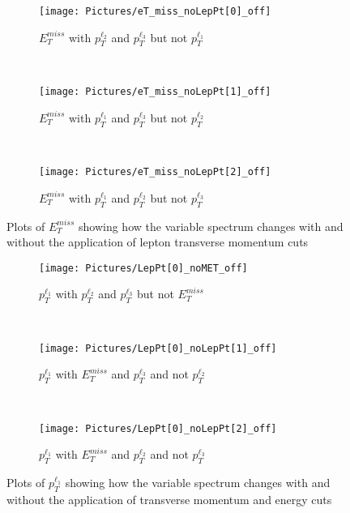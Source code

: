 \begin{figure}[H]
    \centering
    \begin{subfigure}[b]{0.48\textwidth}
        \centering
        \texttt{[image: Pictures/eT\_miss\_noLepPt[0]\_off]}
    \caption{$E_{T}^{miss}$ with $p_{T}^{\ell_{2}}$ and $p_{T}^{\ell_{3}}$ but not $p_{T}^{\ell_{1}}$}
    \end{subfigure}
    ~
    \begin{subfigure}[b]{0.48\textwidth}
        \centering
        \texttt{[image: Pictures/eT\_miss\_noLepPt[1]\_off]}
    \caption{$E_{T}^{miss}$ with $p_{T}^{\ell_{1}}$ and $p_{T}^{\ell_{3}}$ but not $p_{T}^{\ell_{2}}$}    
        \end{subfigure}
    ~
    \begin{subfigure}[b]{0.48\textwidth}
        \centering
        \texttt{[image: Pictures/eT\_miss\_noLepPt[2]\_off]}
    \caption{$E_{T}^{miss}$ with $p_{T}^{\ell_{1}}$ and $p_{T}^{\ell_{2}}$ but not $p_{T}^{\ell_{3}}$}    
        \end{subfigure}
\caption{Plots of $E_{T}^{miss}$ showing how the variable spectrum changes with and without the application of lepton transverse momentum cuts}
\label{fig:ATLAS}
\end{figure}

\begin{figure}[H]
    \centering
    \begin{subfigure}[b]{0.48\textwidth}
        \centering
        \texttt{[image: Pictures/LepPt[0]\_noMET\_off]}
    \caption{$p_{T}^{\ell_{1}}$ with $p_{T}^{\ell_{2}}$ and $p_{T}^{\ell_{3}}$ but not $E_{T}^{miss}$}
    \end{subfigure}
    ~
    \begin{subfigure}[b]{0.48\textwidth}
        \centering
        \texttt{[image: Pictures/LepPt[0]\_noLepPt[1]\_off]}
    \caption{$p_{T}^{\ell_{1}}$ with $E_{T}^{miss}$ and $p_{T}^{\ell_{3}}$ and not $p_{T}^{\ell_{2}}$}    
        \end{subfigure}
    ~
    \begin{subfigure}[b]{0.48\textwidth}
        \centering
        \texttt{[image: Pictures/LepPt[0]\_noLepPt[2]\_off]}
    \caption{$p_{T}^{\ell_{1}}$ with $E_{T}^{miss}$ and $p_{T}^{\ell_{2}}$ and not $p_{T}^{\ell_{3}}$}    
        \end{subfigure}
\caption{Plots of $p_{T}^{\ell_{1}}$ showing how the variable spectrum changes with and without the application of transverse momentum and energy cuts}
\label{fig:ATLAS}
\end{figure}

